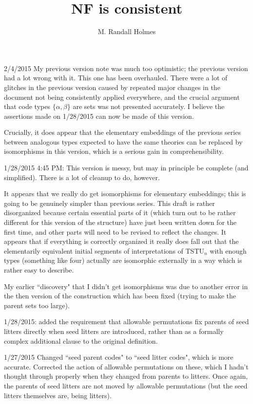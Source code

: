 \documentclass{article}
\title{NF is consistent}
\author{M. Randall Holmes}
\begin{document}
\maketitle


2/4/2015  My previous version note was much too optimistic;  the previous version had a lot wrong with it.   This one has been overhauled.   There were a lot of glitches in the previous version caused by repeated major changes in the document not being consistently applied everywhere, and the crucial argument that code types $\{\alpha,\beta\}$ are sets was not presented accurately.   I believe the assertions made on 1/28/2015 can now be made of this version.

Crucially, it does appear that the elementary embeddings of the previous series between analogous types expected to have the same theories can be replaced by isomorphisms in this version, which is a serious gain in comprehensibility.

1/28/2015  4:45 PM:  This version is messy, but may in principle be complete (and simplified).   There is a lot of cleanup to do, however.

It appears that we really do get isomorphisms for elementary embeddings; this is going to be genuinely simpler than previous series.   This draft is rather disorganized because certain essential parts of it (which turn out to be rather different for this version of the structure) have just been written down for the first time, and other parts will need to be revised to reflect the changes.   It appears that if everything is correctly organized it really does fall out that the elementarily equivalent initial segments of interpretations of TSTU$_n$ with enough types (something like four) actually are isomorphic externally in a way which is rather easy to describe.

My earlier ``discovery" that I didn't get isomorphisms was due to another error in the then version of the construction which has been fixed (trying to make the parent sets too large).

1/28/2015:  added the requirement that allowable permutations fix parents of seed litters directly when seed litters are introduced, rather than as a formally complex additional clause to the original definition.

1/27/2015  Changed ``seed parent codes" to ``seed litter codes", which is more accurate.   Corrected the action of allowable permutations on these, which I hadn't thought through properly when they changed from parents to litters.  Once again, the parents of seed litters are not moved by allowable permutations (but the seed litters themselves are, being litters).
\end{document}
